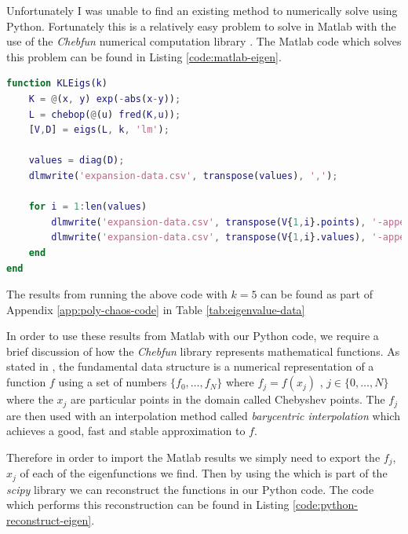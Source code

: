 Unfortunately I was unable to find an existing method to numerically solve
 using Python. Fortunately
this is a relatively easy problem to solve in Matlab with the use of the
\textit{Chebfun} numerical computation library \cite{chebfun}. The Matlab code
which solves this problem can be found in Listing \ref{code:matlab-eigen}.

\begin{lstlisting}[caption={Matlab code which finds the first 5 eigenvalues and
                            associated eigenfunctions},
                   label={code:matlab-eigen},
                   language=Matlab]
function KLEigs(k)
    K = @(x, y) exp(-abs(x-y));
    L = chebop(@(u) fred(K,u));
    [V,D] = eigs(L, k, 'lm');

    values = diag(D);
    dlmwrite('expansion-data.csv', transpose(values), ',');

    for i = 1:len(values)
        dlmwrite('expansion-data.csv', transpose(V{1,i}.points), '-append', 'delimiter', ',');
        dlmwrite('expansion-data.csv', transpose(V{1,i}.values), '-append', 'delimiter', ',');
    end
end
\end{lstlisting}

The results from running the above code with $k = 5$ can be found as part of
Appendix \ref{app:poly-chaos-code} in Table \ref{tab:eigenvalue-data}

In order to use these results from Matlab with our Python
code, we require a brief discussion of how the \textit{Chebfun} library
represents mathematical functions. As stated in \cite{chebfun-data}, the
fundamental data structure  is a numerical representation of a
function $f$ using a set of numbers $\{f_0, \ldots, f_N\}$ where $f_j = f(x_j)$
, $j \in \{0, \ldots, N\}$ where the $x_j$ are particular points in the domain
called Chebyshev points. The $f_j$ are then used with an interpolation method
called \textit{barycentric interpolation} which achieves a good, fast and stable
approximation to $f$.

Therefore in order to import the  Matlab results we simply need to
export the $f_j$, $x_j$ of each of the eigenfunctions we find. Then by using
the  which is part of the \textit{scipy} library
\cite{scipy} we can reconstruct the functions in our Python code. The code
which performs this reconstruction can be found in Listing
\ref{code:python-reconstruct-eigen}.

